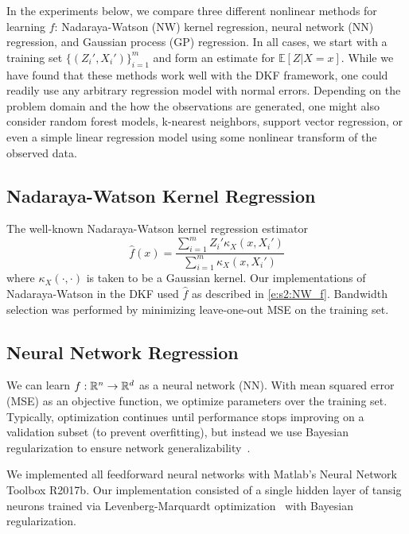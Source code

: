 In the experiments below, we compare three different nonlinear methods for learning $f$: Nadaraya-Watson (NW) kernel regression, neural network (NN) regression, and Gaussian process (GP) regression.  In all cases, we start with a training set $\{(Z_i',X_i')\}_{i=1}^m$ and form an estimate for $\mathbb{E}[Z|X=x]$.  While we have found that these methods work well with the DKF framework, one could readily use any arbitrary regression model with normal errors.  Depending on the problem domain and the how the observations are generated, one might also consider random forest models, k-nearest neighbors, support vector regression, or even a simple linear regression model using some nonlinear transform of the observed data.

\subsection{Nadaraya-Watson Kernel Regression} \label{s:NW_deriv}   
The well-known Nadaraya-Watson kernel regression estimator~\cite{Nad64, Wat64}
\begin{equation} \label{e:s2:NW_f}
\hat f(x) =  \frac{\sum_{i=1}^m Z_i' \kappa_X(x,X_i')}{ \sum_{i=1}^m \kappa_X(x,X_i')}
\end{equation}
where $\kappa_X(\cdot,\cdot)$ is taken to be a Gaussian kernel.  Our implementations of Nadaraya-Watson in the DKF used $\hat f$ as described in \eqref{e:s2:NW_f}.  Bandwidth selection was performed by minimizing leave-one-out MSE on the training set.

\subsection{Neural Network Regression} \label{s:nn}  

We can learn $f:\mathbb{R}^n\to \mathbb{R}^d$ as a neural network (NN). With mean squared error (MSE) as an objective function, we optimize parameters over the training set.  Typically, optimization continues until performance stops improving on a validation subset (to prevent overfitting), but instead we use Bayesian regularization to ensure network generalizability~\cite{Mac92,For97}.

We implemented all feedforward neural networks with Matlab's Neural Network Toolbox R2017b.  Our implementation consisted of a single hidden layer of tansig neurons trained via Levenberg-Marquardt optimization~\cite{Lev44,Mar63,Hag94} with Bayesian regularization. 

